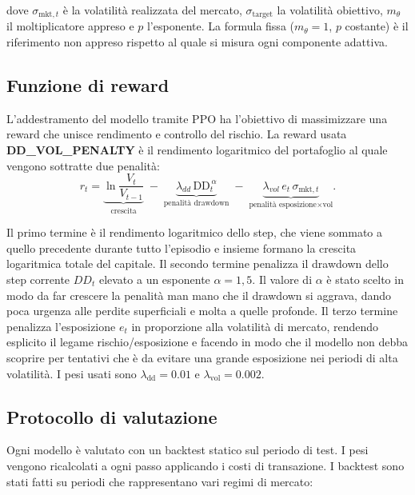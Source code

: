 dove $\sigma_{\text{mkt},t}$ è la volatilità realizzata del mercato,
$\sigma_{\text{target}}$ la volatilità obiettivo, $m_\theta$ il moltiplicatore
appreso e $p$ l'esponente. La formula fissa ($m_\theta=1$, $p$ costante) è il
riferimento non appreso rispetto al quale si misura ogni componente adattiva.

\subsection{Funzione di reward}
L'addestramento del modello tramite PPO ha l'obiettivo di massimizzare una reward che unisce rendimento e controllo del rischio. 
La reward usata \textbf{DD\_VOL\_PENALTY} è il rendimento logaritmico del portafoglio al quale vengono sottratte due penalità:
\begin{equation}
r_t = \underbrace{\ln\!\frac{V_t}{V_{t-1}}}_{\text{crescita}}
      \; - \; \underbrace{\lambda_{dd}\,\mathrm{DD}_t^{\,\alpha}}_{\text{penalità drawdown}}
      \; - \; \underbrace{\lambda_{vol}\, e_t\, \sigma_{\mathrm{mkt},t}}_{\text{penalità esposizione}\times\text{vol}} .
\end{equation}

Il primo termine è il rendimento logaritmico dello step, che viene sommato a quello precedente durante tutto l'episodio e insieme formano la crescita logaritmica totale del capitale.
Il secondo termine penalizza il drawdown dello step corrente $DD_t$ elevato a un esponente $\alpha = 1,5$. 
Il valore di $\alpha$ è stato scelto in modo da far crescere la penalità man mano che il drawdown si aggrava, dando poca urgenza alle perdite superficiali e molta a quelle profonde.
Il terzo termine penalizza l'esposizione $e_t$ in proporzione alla volatilità di mercato, rendendo esplicito il legame rischio/esposizione e facendo in modo che il modello non debba scoprire per tentativi che è da evitare una grande esposizione nei periodi di alta volatilità.
I pesi usati sono
$\lambda_{\text{dd}}=0.01$ e $\lambda_{\text{vol}}=0.002$.

\subsection{Protocollo di valutazione}
Ogni modello è valutato con un backtest statico sul periodo di test. I pesi vengono ricalcolati a ogni
passo applicando i costi di transazione. I backtest sono stati fatti su periodi che rappresentano vari regimi di mercato:

